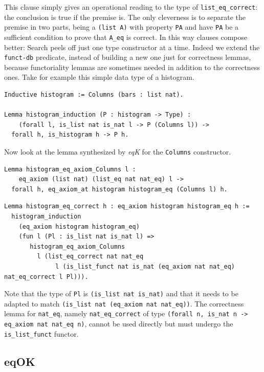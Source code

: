 \documentclass[a4paper,UKenglish,cleveref, autoref]{lipics-v2019}
\newcommand{\derive}[1]{\emph{#1}}
\begin{document}
\noindent
This clause simply gives an operational reading to the type
of \lstinline+list_eq_correct+: the conclusion is true if the premise
is. The only cleverness is to separate the premise in two parts,
being a \lstinline+(list A)+ with property \lstinline+PA+ and have
\lstinline+PA+ be a sufficient condition to prove that \lstinline+A_eq+
is correct. In this way clauses compose better:
Search peels off just one type constructor at a time.
Indeed we extend the \lstinline+funct-db+ predicate, instead of building
a new one just for correctness lemmas, because functoriality lemmas
are sometimes needed in addition to the correctness ones.
Take for example this simple data type of a histogram.

\begin{lstlisting}
Inductive histogram := Columns (bars : list nat).

Lemma histogram_induction (P : histogram -> Type) :
    (forall l, is_list nat is_nat l -> P (Columns l)) ->
  forall h, is_histogram h -> P h.
\end{lstlisting}

Now look at the lemma synthesized by \derive{eqK}
for the \lstinline+Columns+ constructor.

\begin{lstlisting}
Lemma histogram_eq_axiom_Columns l :
    eq_axiom (list nat) (list_eq nat nat_eq) l ->
  forall h, eq_axiom_at histogram histogram_eq (Columns l) h.
\end{lstlisting}

\begin{lstlisting}
Lemma histogram_eq_correct h : eq_axiom histogram histogram_eq h :=
  histogram_induction 
    (eq_axiom histogram histogram_eq)
    (fun l (Pl : is_list nat is_nat l) =>
       histogram_eq_axiom_Columns
         l (list_eq_correct nat nat_eq
              l (is_list_funct nat is_nat (eq_axiom nat nat_eq) nat_eq_correct l Pl))).
\end{lstlisting}

\noindent
Note that the type of \lstinline+Pl+ is
\lstinline+(is_list nat is_nat)+ and that it
needs to be adapted to match
\lstinline+(is_list nat (eq_axiom nat nat_eq))+.
The correctness lemma for \lstinline+nat_eq+, namely \lstinline+nat_eq_correct+ of type
\lstinline+(forall n, is_nat n -> eq_axiom nat nat_eq n)+, cannot be used directly
but must undergo the \lstinline+is_list_funct+ functor.

\subsection{eqOK} %
\end{document}
